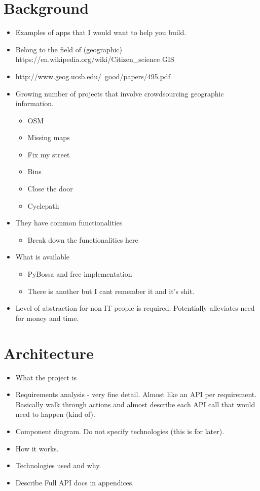 \documentclass{article}
\let\oldsection\section
\renewcommand\section{\clearpage\oldsection}
\begin{document}
	\section{Background}
		\begin{itemize}
			\item Examples of apps that I would want to help you build.
			\item Belong to the field of (geographic) https://en.wikipedia.org/wiki/Citizen\_science GIS
			\item http://www.geog.ucsb.edu/~good/papers/495.pdf
			\item Growing number of projects that involve crowdsourcing geographic information.
			\begin{itemize}
				\item OSM
				\item Missing maps
				\item Fix my street
				\item Bins
				\item Close the door
				\item Cyclepath
			\end{itemize}
			\item They have common functionalities
			\begin{itemize}
				\item Break down the functionalities here
			\end{itemize}
			\item What is available
			\begin{itemize}
				\item PyBossa and free implementation
				\item There is another but I cant remember it and it's shit.
			\end{itemize}
			\item Level of abstraction for non IT people is required. Potentially alleviates need for money and time.
		\end{itemize}
	\section{Architecture}
		\begin{itemize}
			\item What the project is
			\item Requirements analysis - very fine detail. Almost like an API per requirement. Basically walk through actions and almost describe each API call that would need to happen (kind of).
			\item Component diagram. Do not specify technologies (this is for later).
			\item How it works.
			\item Technologies used and why.
			\item Describe Full API docs in appendices.
		\end{itemize}
\end{document}
